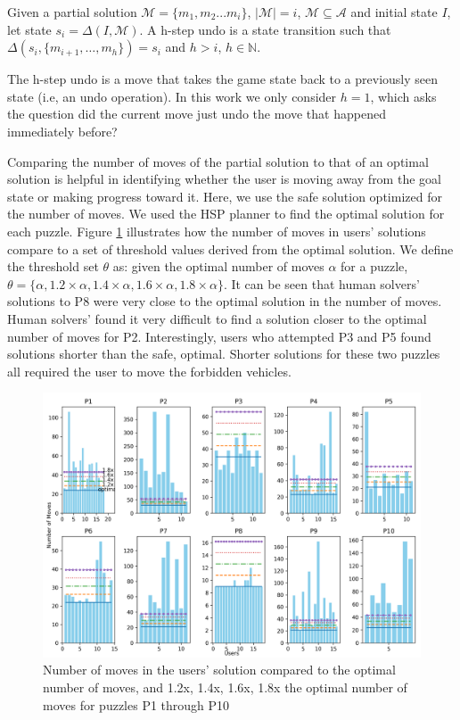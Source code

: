 \begin{definition}
Given a partial solution $\mathcal{M}=\lbrace m_1, m_2...m_i \rbrace$, $|\mathcal{M}|=i$, $\mathcal{M}\subseteq \mathcal{A}$ and initial state $I$, let state $s_i=\Delta(I,\mathcal{M})$. A h-step undo is a state transition such that $\Delta(s_i, \lbrace m_{i+1}, \ldots, m_h\rbrace)=s_i$ and $h>i$, $h \in \mathbb{N}$.
\end{definition}

The h-step undo is a move that takes the game state back to a previously seen state (i.e, an undo operation). In this work we only consider $h=1$, which asks the question did the current move just undo the move that happened immediately before?

Comparing the number of moves of the partial solution to that of an optimal solution is helpful in identifying whether the user is moving away from the goal state or making progress toward it. Here, we use the safe solution optimized for the number of moves. We used the HSP planner to find the optimal solution for each puzzle. Figure \ref{fig:difficuly} illustrates how the number of moves in users' solutions compare to a set of threshold values derived from the optimal solution. We define the threshold set $\theta$ as: given the optimal number of moves  $\alpha$ for a puzzle, $\theta=\lbrace \alpha, 1.2\times \alpha, 1.4\times \alpha, 1.6\times \alpha, 1.8\times \alpha\rbrace$. It can be seen that human solvers' solutions to P8 were very close to the optimal solution in the number of moves. Human solvers' found it very difficult to find a solution closer to the optimal number of moves for P2. Interestingly, users who attempted P3 and P5 found solutions shorter than the safe, optimal. Shorter solutions for these two puzzles all required the user to move the forbidden vehicles.

\begin{figure}[hbt]
  \centering
\includegraphics[width=\columnwidth]{img/difficulty.png}
  \caption{Number of moves in the users' solution compared to the optimal number of moves, and 1.2x, 1.4x, 1.6x, 1.8x the optimal number of moves for puzzles P1 through P10}
  \label{fig:difficuly}
\end{figure}

